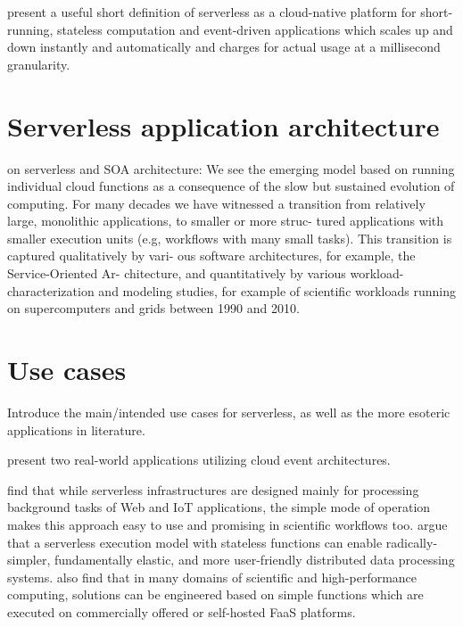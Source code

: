 \documentclass[utf8,english]{gradu3}
\begin{document}
\textcite{fox17} present a useful short definition of serverless as a cloud-native platform for short-running, stateless computation and event-driven applications which scales up and down instantly and automatically and charges for actual usage at a millisecond granularity.

\section{Serverless application architecture}

\textcite{van2017spec} on serverless and SOA architecture: We see the emerging model based on running individual cloud functions as a consequence of the slow but sustained evolution of computing. For many decades we have witnessed a transition from relatively large, monolithic applications, to smaller or more struc- tured applications with smaller execution units (e.g, workflows with many small tasks). This transition is captured qualitatively by vari- ous software architectures, for example, the Service-Oriented Ar- chitecture, and quantitatively by various workload-characterization and modeling studies, for example of scientific workloads running on supercomputers and grids between 1990 and 2010.


\section{Use cases}

Introduce the main/intended use cases for serverless, as well as the more esoteric applications in literature.

\textcite{mcgrath16cloudEventParadigms} present two real-world applications utilizing cloud event architectures.

\textcite{malawski17executescientific} find that while serverless infrastructures are designed mainly for processing background tasks of Web and IoT applications, the simple mode of operation makes this approach easy to use and promising in scientific workflows too. \textcite{jonas17occupy} argue that a serverless execution model with stateless functions can enable radically-simpler, fundamentally elastic, and more user-friendly distributed data processing systems. \textcite{spillner18faaster} also find that in many domains of scientific and high-performance computing, solutions can be engineered based on simple functions which are executed on commercially offered or self-hosted FaaS platforms.
\end{document}
